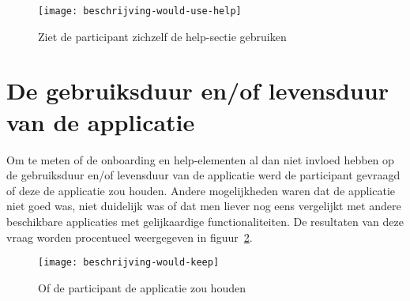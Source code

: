 \begin{figure}[h]
    \centering
    \texttt{[image: beschrijving-would-use-help]}
    \caption{Ziet de participant zichzelf de help-sectie gebruiken}
    \label{fig:beschrijving-would-use-help}
\end{figure}

\section{De gebruiksduur en/of levensduur van de applicatie}
\label{sec:gebruiksduur}

Om te meten of de onboarding en help-elementen al dan niet invloed hebben op de gebruiksduur en/of levensduur van de applicatie werd de participant gevraagd of deze de applicatie zou houden. Andere mogelijkheden waren dat de applicatie niet goed was, niet duidelijk was of dat men liever nog eens vergelijkt met andere beschikbare applicaties met gelijkaardige functionaliteiten. De resultaten van deze vraag worden procentueel weergegeven in figuur~\ref{fig:beschrijving-would-keep}.

\begin{figure}[h]
    \centering
    \texttt{[image: beschrijving-would-keep]}
    \caption{Of de participant de applicatie zou houden}
    \label{fig:beschrijving-would-keep}
\end{figure}
